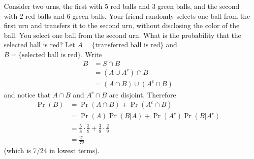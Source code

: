 \documentclass[captions=tableheading]{scrbook}
\begin{document}
\begin{example}
Consider two urns, the first with 5 red balls and 3 green balls, and the second with 2 red balls and 6 green balls. Your friend randomly selects one ball from the first urn and transfers it to the second urn, without disclosing the color of the ball. You select one ball from the second urn. What is the probability that the selected ball is red? Let \( A = \{ \mbox{transferred ball is red} \} \) and \( B = \{ \mbox{selected ball is red} \} \). Write
\begin{align*}
B & =S\cap B\\
 & =(A\cup A^{c})\cap B\\
 & =(A\cap B)\cup(A^{c}\cap B)
\end{align*}
and notice that \(A\cap B\) and \(A^{c}\cap B\) are disjoint. Therefore
\begin{align*}
\Pr(B) & =\Pr(A\cap B)+\Pr(A^{c}\cap B)\\
 & =\Pr(A)\Pr(B|A)+\Pr(A^{c})\Pr(B|A^{c})\\
 & =\frac{5}{8}\cdot\frac{3}{9}+\frac{3}{8}\cdot\frac{2}{9}\\
 & =\frac{21}{72}\ 
\end{align*}
(which is 7/24 in lowest terms).

\end{example}
\end{document}
